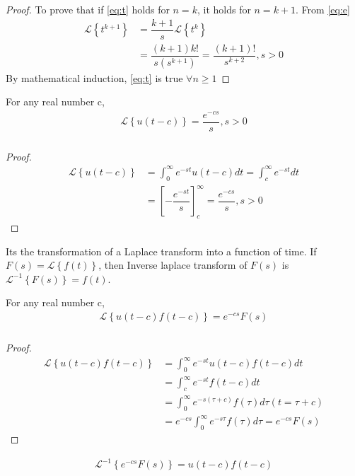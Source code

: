 \documentclass{beamer}
\providecommand{\brak}[1]{\ensuremath{\left(#1\right)}}
\providecommand{\sbrak}[1]{\ensuremath{{}\left[#1\right]}}
\providecommand{\brak}[1]{\ensuremath{\left(#1\right)}}
\providecommand{\cbrak}[1]{\ensuremath{\left\{#1\right\}}}
\begin{document}
\begin{frame}
\frametitle{}
\begin{proof}
To prove that if \eqref{eq:t} holds for $n=k$, it holds for $n=k+1$. From \eqref{eq:e}
\begin{align}
    \mathcal{L}\cbrak{t^{k+1}}&=\dfrac{k+1}{s}\mathcal{L}\cbrak{t^{k}}\\
    &=\dfrac{(k+1)k!}{s(s^{k+1})}=\dfrac{(k+1)!}{s^{k+2}},s>0
\end{align}
By mathematical induction, \eqref{eq:t} is true $\forall n\geq 1$
\end{proof}
\begin{lemma}
For any real number c, 
\begin{align}
    \mathcal{L}\cbrak{u(t-c)}=\dfrac{e^{-cs}}{s}, s>0
    \label{eq:u}
\end{align}
\end{lemma}
\end{frame}

\begin{frame}
\frametitle{}
\begin{proof}
 \begin{align}
     \mathcal{L}\cbrak{u(t-c)}&=\int_{0}^{\infty}e^{-st}u(t-c)dt=\int_{c}^{\infty}e^{-st}dt\\
     &=\sbrak{-\dfrac{e^{-st}}{s}}_{c}^{\infty}=\dfrac{e^{-cs}}{s}, s>0
 \end{align}
\end{proof}
\begin{definition}
Its the transformation of a Laplace transform into a function of time. If $F(s)=\mathcal{L}\cbrak{f(t)}$, then Inverse laplace transform of $F(s)$ is $\mathcal{L}^{-1}\cbrak{F(s)}=f(t)$.
\end{definition}
\begin{lemma}
For any real number c,
\begin{align}
    \mathcal{L}\cbrak{u(t-c)f(t-c)}=e^{-cs}F(s)
    \label{eq:uf}
\end{align}
\end{lemma}
\end{frame}

\begin{frame}
\frametitle{}
\begin{proof}
\begin{align}
    \mathcal{L}\cbrak{u(t-c)f(t-c)}&=\int_{0}^{\infty}e^{-st}u(t-c)f(t-c)dt\\
    &=\int_{c}^{\infty}e^{-st}f(t-c)dt\\
    &=\int_{0}^{\infty}e^{-s(\tau+c)}f(\tau)d\tau \brak{t=\tau+c}\\
    &=e^{-cs}\int_{0}^{\infty}e^{-s\tau}f(\tau)d\tau=e^{-cs}F(s)
\end{align}
\end{proof}
\begin{corollary}
\begin{align}
    \mathcal{L}^{-1}\cbrak{e^{-cs}F(s)}=u(t-c)f(t-c)
\end{align}
\end{corollary}
\end{frame}
\end{document}

